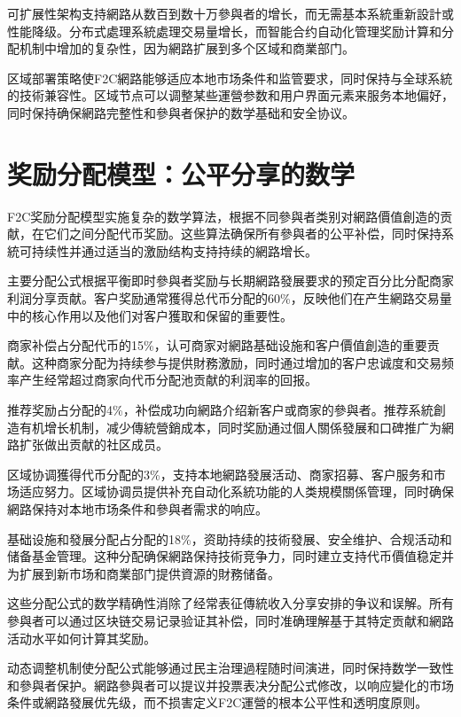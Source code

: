 \documentclass[
  Letterpaper,
]{scrbook}
\begin{document}
可扩展性架构支持網路从数百到数十万參與者的增长，而无需基本系統重新設計或性能降级。分布式處理系統處理交易量增长，而智能合约自动化管理奖励计算和分配机制中增加的复杂性，因为網路扩展到多个区域和商業部门。

区域部署策略使F2C網路能够适应本地市场条件和监管要求，同时保持与全球系統的技術兼容性。区域节点可以调整某些運營参数和用户界面元素来服务本地偏好，同时保持确保網路完整性和參與者保护的数学基础和安全协议。

\section{奖励分配模型：公平分享的数学}\label{ux5956ux52b1ux5206ux914dux6a21ux578bux516cux5e73ux5206ux4eabux7684ux6570ux5b66}

F2C奖励分配模型实施复杂的数学算法，根据不同參與者类别对網路價值創造的贡献，在它们之间分配代币奖励。这些算法确保所有參與者的公平补偿，同时保持系統可持续性并通过适当的激励结构支持持续的網路增长。

主要分配公式根据平衡即时參與者奖励与长期網路發展要求的预定百分比分配商家利润分享贡献。客户奖励通常獲得总代币分配的60\%，反映他们在产生網路交易量中的核心作用以及他们对客户獲取和保留的重要性。

商家补偿占分配代币的15\%，认可商家对網路基础设施和客户價值創造的重要贡献。这种商家分配为持续参与提供財務激励，同时通过增加的客户忠诚度和交易频率产生经常超过商家向代币分配池贡献的利润率的回报。

推荐奖励占分配的4\%，补偿成功向網路介绍新客户或商家的參與者。推荐系統創造有机增长机制，减少傳統營銷成本，同时奖励通过個人關係發展和口碑推广为網路扩张做出贡献的社区成员。

区域协调獲得代币分配的3\%，支持本地網路發展活动、商家招募、客户服务和市场适应努力。区域协调员提供补充自动化系統功能的人类規模關係管理，同时确保網路保持对本地市场条件和參與者需求的响应。

基础设施和發展分配占分配的18\%，资助持续的技術發展、安全维护、合规活动和储备基金管理。这种分配确保網路保持技術竞争力，同时建立支持代币價值稳定并为扩展到新市场和商業部门提供資源的財務储备。

这些分配公式的数学精确性消除了经常表征傳統收入分享安排的争议和误解。所有參與者可以通过区块链交易记录验证其补偿，同时准确理解基于其特定贡献和網路活动水平如何计算其奖励。

动态调整机制使分配公式能够通过民主治理過程随时间演进，同时保持数学一致性和參與者保护。網路參與者可以提议并投票表决分配公式修改，以响应變化的市场条件或網路發展优先级，而不损害定义F2C運營的根本公平性和透明度原则。
\end{document}
